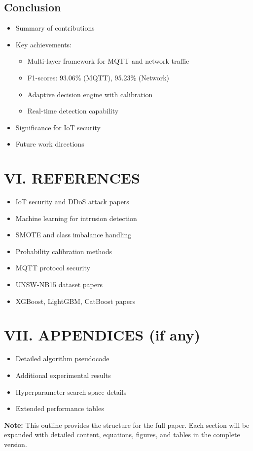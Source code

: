 \documentclass[conference]{IEEEtran}
\begin{document}
\subsection{Conclusion}
\begin{itemize}
    \item Summary of contributions
    \item Key achievements:
        \begin{itemize}
            \item Multi-layer framework for MQTT and network traffic
            \item F1-scores: 93.06\% (MQTT), 95.23\% (Network)
            \item Adaptive decision engine with calibration
            \item Real-time detection capability
        \end{itemize}
    \item Significance for IoT security
    \item Future work directions
\end{itemize}

\section{VI. REFERENCES}
\begin{itemize}
    \item IoT security and DDoS attack papers
    \item Machine learning for intrusion detection
    \item SMOTE and class imbalance handling
    \item Probability calibration methods
    \item MQTT protocol security
    \item UNSW-NB15 dataset papers
    \item XGBoost, LightGBM, CatBoost papers
\end{itemize}

\section{VII. APPENDICES (if any)}
\begin{itemize}
    \item Detailed algorithm pseudocode
    \item Additional experimental results
    \item Hyperparameter search space details
    \item Extended performance tables
\end{itemize}

\vspace{1cm}
\noindent\textbf{Note:} This outline provides the structure for the full paper. Each section will be expanded with detailed content, equations, figures, and tables in the complete version.
\end{document}
